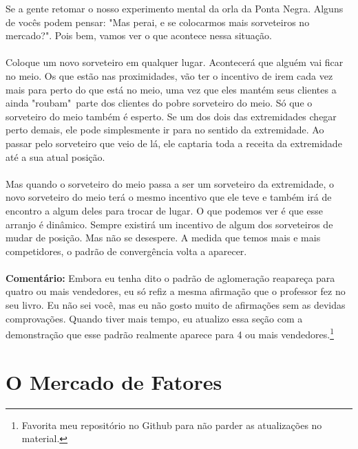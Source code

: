 \documentclass[a4paper,11pt,oneside]{book}
\theoremstyle{definition}
\theoremstyle{break}
\begin{document}
Se a gente retomar o nosso experimento mental da orla da Ponta Negra. Alguns de vocês podem pensar: "Mas perai, e se colocarmos mais sorveteiros no mercado?". Pois bem, vamos ver o que acontece nessa situação.
\\
\\
Coloque um novo sorveteiro em qualquer lugar. Acontecerá que alguém vai ficar no meio. Os que estão nas proximidades, vão ter o incentivo de irem cada vez mais para perto do que está no meio, uma vez que eles mantém seus clientes a ainda "roubam"\ parte dos clientes do pobre sorveteiro do meio. Só que o sorveteiro do meio também é esperto. Se um dos dois das extremidades chegar perto demais, ele pode simplesmente ir para no sentido da extremidade. Ao passar pelo sorveteiro que veio de lá, ele captaria toda a receita da extremidade até a sua atual posição.
\\
\\
Mas quando o sorveteiro do meio passa a ser um sorveteiro da extremidade, o novo sorveteiro do meio terá o mesmo incentivo que ele teve e também irá de encontro a algum deles para trocar de lugar. O que podemos ver é que esse arranjo é dinâmico. Sempre existirá um incentivo de algum dos sorveteiros de mudar de posição. Mas não se desespere. A medida que temos mais e mais competidores, o padrão de convergência volta a aparecer.
\\
\\
\textbf{Comentário:} Embora eu tenha dito o padrão de aglomeração reapareça para quatro ou mais vendedores, eu só refiz a mesma afirmação que o professor fez no seu livro. Eu não sei você, mas eu não gosto muito de afirmações sem as devidas comprovações. Quando tiver mais tempo, eu atualizo essa seção com a demonstração que esse padrão realmente aparece para 4 ou mais vendedores.\footnote{Favorita meu repositório no Github para não parder as atualizações no material.}

\chapter{O Mercado de Fatores}
\end{document}
